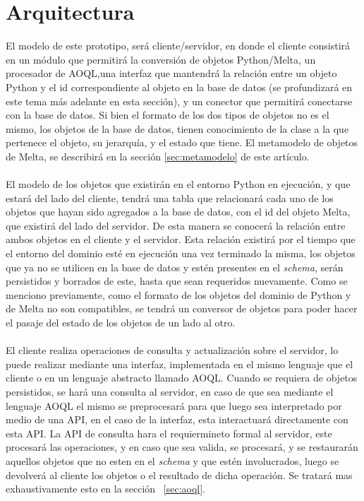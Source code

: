 \documentclass{melta}
\begin{document}
\section{Arquitectura}
\label{sec:arquitectura}
El modelo de este prototipo, será cliente/servidor, en donde el cliente consistirá en un módulo que permitirá la conversión de objetos Python/Melta, un procesador de AOQL,una interfaz que mantendrá la relación entre un objeto Python y el id correspondiente al objeto en la base de datos (se profundizará en este tema más adelante en esta sección), y un conector que permitirá conectarse con la base de datos. Si bien el formato de los dos tipos de objetos no es el mismo, los objetos de la base de datos, tienen conocimiento de la clase a la que pertenece el objeto, su jerarquía, y el estado que tiene. El metamodelo de objetos de Melta, se describirá en la sección \ref{sec:metamodelo} de este artículo.
\\\\
El modelo de los objetos que existirán en el entorno Python en ejecución, y que estará del lado del cliente, tendrá una tabla que relacionará cada uno de los objetos que hayan sido agregados a la base de datos, con el id del objeto Melta, que existirá del lado del servidor. De esta manera se conocerá la relación entre ambos objetos en el cliente y el servidor. Esta relación existirá por el tiempo que el entorno del dominio esté en ejecución una vez terminado la misma, los objetos que ya no se utilicen en la base de datos y estén presentes en el \textit{schema}, serán persistidos y borrados de este, hasta que sean requeridos nuevamente. Como se menciono previamente, como el formato de los objetos del dominio de Python y de Melta no son compatibles, se tendrá un conversor de objetos para poder hacer el pasaje del estado de los objetos de un lado al otro.
\\\\
El cliente realiza operaciones de consulta y actualización sobre el servidor, lo puede realizar mediante una interfaz, implementada en el mismo lenguaje que el cliente o en un lenguaje abstracto llamado AOQL. Cuando se requiera de objetos persistidos, se hará una consulta al servidor, en caso de que sea mediante el lenguaje AOQL el mismo se preprocesará para que luego sea interpretado por medio de una API, en el caso de la interfaz, esta interactuará directamente con esta API. La API de consulta hara el requiermineto formal al servidor, este procesará las operaciones, y en caso que sea valida, se procesará, y se restaurarán aquellos objetos que no esten en el \textit{schema} y que estén involucrados, luego se devolverá al cliente los objetos o el resultado de dicha operación. Se tratará mas exhaustivamente esto en la sección ~\ref{sec:aoql}.
\end{document}
